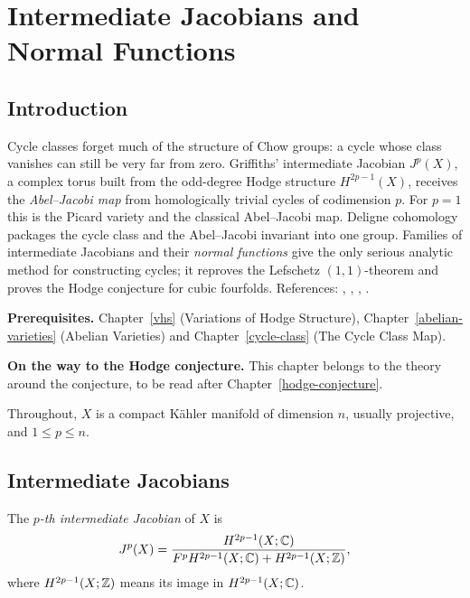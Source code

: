 \chapter{Intermediate Jacobians and Normal Functions}\label{intermediate-jacobians}

\section{Introduction}\label{intermediate-jacobians:section-introduction}

Cycle classes forget much of the structure of Chow groups: a cycle whose class vanishes can still be very far from zero. Griffiths' intermediate Jacobian
$J^p(X)$, a complex torus built from the odd-degree Hodge structure $H^{2p-1}(X)$, receives the \emph{Abel--Jacobi map} from homologically trivial cycles of
codimension $p$. For $p = 1$ this is the Picard variety and the classical Abel--Jacobi map. Deligne cohomology packages the cycle class and the Abel--Jacobi
invariant into one group. Families of intermediate Jacobians and their \emph{normal functions} give the only serious analytic method for constructing cycles; it
reproves the Lefschetz $(1,1)$-theorem and proves the Hodge conjecture for cubic fourfolds. References: \cite[Chapter 12]{voisin-hodge-1}, \cite{voisin-hodge-2},
\cite{griffiths-periods}, \cite{carlson-muller-stach-peters}.

\noindent\textbf{Prerequisites.} Chapter~\ref{vhs} (Variations of Hodge Structure), Chapter~\ref{abelian-varieties} (Abelian Varieties) and Chapter~\ref{cycle-class}
(The Cycle Class Map).

\noindent\textbf{On the way to the Hodge conjecture.} This chapter belongs to the theory around the conjecture, to be read after Chapter~\ref{hodge-conjecture}.

Throughout, $X$ is a compact K\"ahler manifold of dimension $n$, usually projective, and $1 \leq p \leq n$.

\section{Intermediate Jacobians}\label{intermediate-jacobians:section-definition}

\begin{definition}\label{intermediate-jacobians:definition-intermediate-jacobian}
The \emph{$p$-th intermediate Jacobian} of $X$ is
\[
J^p(X) = \frac{H^{2p-1}(X; \mathbb{C})}{F^pH^{2p-1}(X; \mathbb{C}) + H^{2p-1}(X; \mathbb{Z})} ,
\]
where $H^{2p-1}(X; \mathbb{Z})$ means its image in $H^{2p-1}(X; \mathbb{C})$.
\end{definition}

